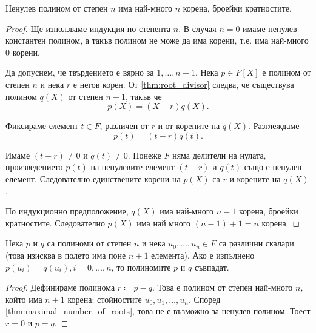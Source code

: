 \documentclass{../../common/topic}
\begin{document}
\begin{lemma}\label{thm:maximal_number_of_roots}
  Ненулев полином от степен \( n \) има най-много \( n \) корена, броейки кратностите.
\end{lemma}
\begin{proof}
  Ще използваме индукция по степента \( n \). В случая \( n = 0 \) имаме ненулев константен полином, а такъв полином не може да има корени, т.е. има най-много \( 0 \) корени.

  Да допуснем, че твърдението е вярно за \( 1, \ldots, n - 1 \). Нека \( p \in F[X] \) е полином от степен \( n \) и нека \( r \) е негов корен. От \cref{thm:root_divisor} следва, че съществува полином \( q(X) \) от степен \( n - 1 \), такъв че
  \begin{equation*}
    p(X) = (X - r) q(X).
  \end{equation*}

  Фиксираме елемент \( t \in F \), различен от \( r \) и от корените на \( q(X) \). Разглеждаме
  \begin{equation*}
    p(t) = (t - r) q(t).
  \end{equation*}

  Имаме \( (t - r) \neq 0 \) и \( q(t) \neq 0 \). Понеже \( F \) няма делители на нулата, произведението \( p(t) \) на ненулевите елемент \( (t - r) \) и \( q(t) \) също е ненулев елемент. Следователно единствените корени на \( p(X) \) са \( r \) и корените на \( q(X) \).

  По индукционно предположение, \( q(X) \) има най-много \( n - 1 \) корена, броейки кратностите. Следователно \( p(X) \) има най много \( (n - 1) + 1 = n \) корена.
\end{proof}

\begin{theorem}\label{thm:coefficient_comparison_principle}
  Нека \( p \) и \( q \) са полиноми от степен \( n \) и нека \( u_0, \ldots, u_n \in F \) са различни скалари (това изисква в полето има поне \( n+1 \) елемента). Ако е изпълнено \( p(u_i) = q(u_i), i = 0, \ldots, n \), то полиномите \( p \) и \( q \) съвпадат.
\end{theorem}
\begin{proof}
  Дефинираме полинома \( r \coloneqq p - q \). Това е полином от степен най-много \( n \), който има \( n + 1 \) корена: стойностите \( u_0, u_1, \ldots, u_n \). Според \cref{thm:maximal_number_of_roots}, това не е възможно за ненулев полином. Тоест \( r = 0 \) и \( p = q \).
\end{proof}
\end{document}
